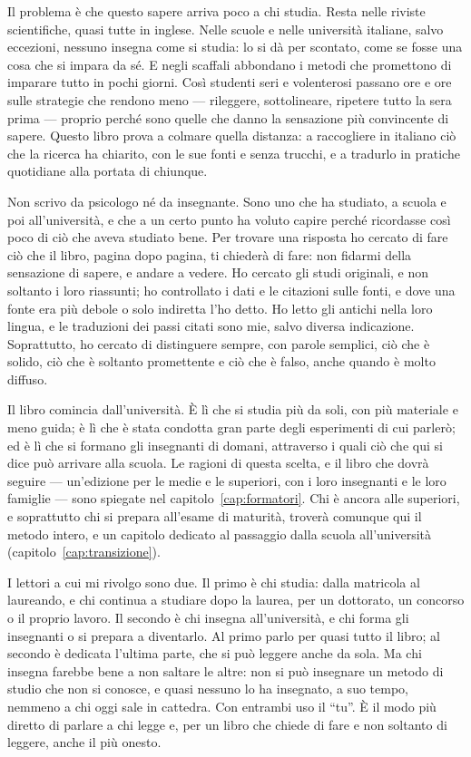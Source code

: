 Il problema è che questo sapere arriva poco a chi studia. Resta nelle
riviste scientifiche, quasi tutte in inglese. Nelle scuole e nelle
università italiane, salvo eccezioni, nessuno insegna come si studia:
lo si dà per scontato, come se fosse una cosa che si impara da sé. E
negli scaffali abbondano i metodi che promettono di imparare tutto in
pochi giorni. Così studenti seri e volenterosi passano ore e ore sulle
strategie che rendono meno --- rileggere, sottolineare, ripetere tutto
la sera prima --- proprio perché sono quelle che danno la sensazione
più convincente di sapere. Questo libro prova a colmare quella
distanza: a raccogliere in italiano ciò che la ricerca ha chiarito, con
le sue fonti e senza trucchi, e a tradurlo in pratiche quotidiane alla
portata di chiunque.

Non scrivo da psicologo né da insegnante. Sono uno che ha studiato, a
scuola e poi all'università, e che a un certo punto ha voluto capire
perché ricordasse così poco di ciò che aveva studiato bene. Per trovare
una risposta ho cercato di fare ciò che il libro, pagina dopo pagina,
ti chiederà di fare: non fidarmi della sensazione di sapere, e andare a
vedere. Ho cercato gli studi originali, e non soltanto i loro
riassunti; ho controllato i dati e le citazioni sulle fonti, e dove una
fonte era più debole o solo indiretta l'ho detto. Ho letto gli antichi
nella loro lingua, e le traduzioni dei passi citati sono mie, salvo
diversa indicazione. Soprattutto, ho cercato di distinguere sempre, con
parole semplici, ciò che è solido, ciò che è soltanto promettente e ciò
che è falso, anche quando è molto diffuso.

Il libro comincia dall'università. È lì che si studia più da soli, con
più materiale e meno guida; è lì che è stata condotta gran parte degli
esperimenti di cui parlerò; ed è lì che si formano gli insegnanti di
domani, attraverso i quali ciò che qui si dice può arrivare alla
scuola. Le ragioni di questa scelta, e il libro che dovrà seguire ---
un'edizione per le medie e le superiori, con i loro insegnanti e le
loro famiglie --- sono spiegate nel capitolo~\ref{cap:formatori}. Chi
è ancora alle superiori, e soprattutto chi si prepara all'esame di
maturità, troverà comunque qui il metodo intero, e un capitolo dedicato
al passaggio dalla scuola all'università
(capitolo~\ref{cap:transizione}).

I lettori a cui mi rivolgo sono due. Il primo è chi studia: dalla
matricola al laureando, e chi continua a studiare dopo la laurea, per
un dottorato, un concorso o il proprio lavoro. Il secondo è chi
insegna all'università, e chi forma gli insegnanti o si prepara a
diventarlo. Al primo parlo per quasi tutto il libro; al secondo è
dedicata l'ultima parte, che si può leggere anche da sola. Ma chi
insegna farebbe bene a non saltare le altre: non si può insegnare un
metodo di studio che non si conosce, e quasi nessuno lo ha insegnato,
a suo tempo, nemmeno a chi oggi sale in cattedra. Con entrambi uso il
\enquote{tu}. È il modo più diretto di parlare a chi legge e, per un
libro che chiede di fare e non soltanto di leggere, anche il più
onesto.

